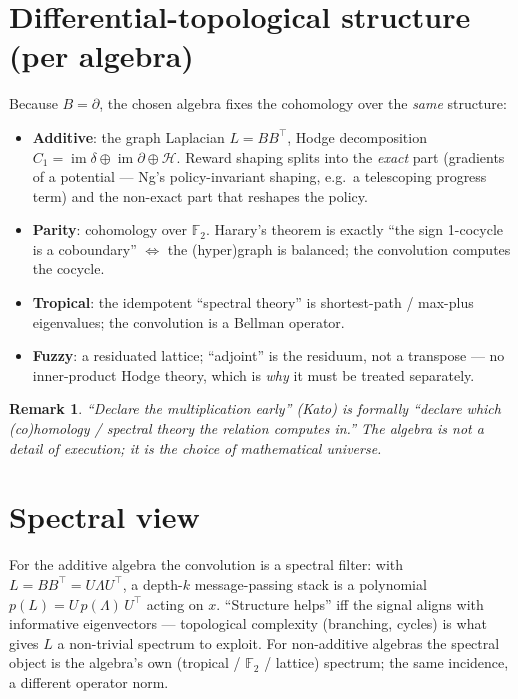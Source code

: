 \documentclass[11pt]{article}
\newtheorem{remark}{Remark}
\begin{document}
\section{Differential-topological structure (per algebra)}\label{sec:diff}
Because $B=\partial$, the chosen algebra fixes the cohomology over the \emph{same} structure:
\begin{itemize}[nosep]
  \item \textbf{Additive}: the graph Laplacian $L=BB^{\!\top}$, Hodge decomposition
        $C_1=\operatorname{im}\delta\oplus\operatorname{im}\partial\oplus\mathcal H$. Reward shaping splits into the
        \emph{exact} part (gradients of a potential --- Ng's policy-invariant shaping, e.g.\ a telescoping
        progress term) and the non-exact part that reshapes the policy.
  \item \textbf{Parity}: cohomology over $\mathbb{F}_2$. Harary's theorem is exactly ``the sign 1-cocycle is a
        coboundary'' $\iff$ the (hyper)graph is balanced; the convolution computes the cocycle.
  \item \textbf{Tropical}: the idempotent ``spectral theory'' is shortest-path / max-plus eigenvalues; the
        convolution is a Bellman operator.
  \item \textbf{Fuzzy}: a residuated lattice; ``adjoint'' is the residuum, not a transpose --- no inner-product
        Hodge theory, which is \emph{why} it must be treated separately.
\end{itemize}
\begin{remark}
``Declare the multiplication early'' (Kato) is formally ``declare which (co)homology / spectral theory the relation
computes in.'' The algebra is not a detail of execution; it is the choice of mathematical universe.
\end{remark}

\section{Spectral view}
For the additive algebra the convolution is a spectral filter: with $L=BB^{\!\top}=U\Lambda U^{\!\top}$, a depth-$k$
message-passing stack is a polynomial $p(L)=U\,p(\Lambda)\,U^{\!\top}$ acting on $x$. ``Structure helps'' iff the
signal aligns with informative eigenvectors --- topological complexity (branching, cycles) is what gives $L$ a
non-trivial spectrum to exploit. For non-additive algebras the spectral object is the algebra's own (tropical /
$\mathbb{F}_2$ / lattice) spectrum; the same incidence, a different operator norm.
\end{document}
